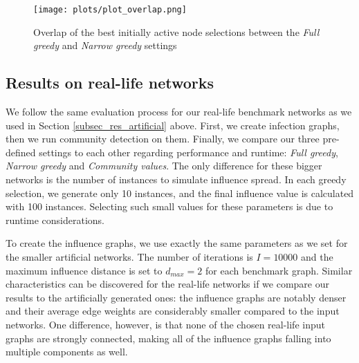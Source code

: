 \documentclass[pdflatex,sn-mathphys-num]{sn-jnl}
\begin{document}
\begin{figure}[ht]
\centering
\texttt{[image: plots/plot\_overlap.png]}
\caption{Overlap of the best initially active node selections between the \textit{Full greedy} and \textit{Narrow greedy} settings}
\label{fig_overlap}
\end{figure}


\subsection{Results on real-life networks}\label{subsec_res_reallife}

We follow the same evaluation process for our real-life benchmark networks as we used in Section \ref{subsec_res_artificial} above. First, we create infection graphs, then we run community detection on them. Finally, we compare our three pre-defined settings to each other regarding performance and runtime: \textit{Full greedy}, \textit{Narrow greedy} and \textit{Community values}. The only difference for these bigger networks is the number of instances to simulate influence spread. In each greedy selection, we generate only 10 instances, and the final influence value is calculated with 100 instances. Selecting such small values for these parameters is due to runtime considerations.

To create the influence graphs, we use exactly the same parameters as we set for the smaller artificial networks. The number of iterations is $I = 10000$ and the maximum influence distance is set to $d_{max} = 2$ for each benchmark graph. Similar characteristics can be discovered for the real-life networks if we compare our results to the artificially generated ones: the influence graphs are notably denser and their average edge weights are considerably smaller compared to the input networks. One difference, however, is that none of the chosen real-life input graphs are strongly connected, making all of the influence graphs falling into multiple components as well.
\end{document}
